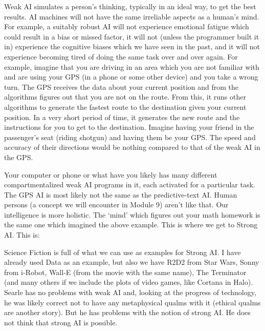 Weak AI simulates a person's thinking, typically in an ideal way, to get the best results. AI machines will not have the same irreliable aspects as a human's mind. For example, a suitably robust AI will not experience emotional fatigue which could result in a bias or missed factor, it will not (unless the programmer built it in) experience the cognitive biases which we have seen in the past, and it will not experience becoming tired of doing the same task over and over again. For example, imagine that you are driving in an area which you are not familiar with and are using your GPS (in a phone or some other device) and you take a wrong turn. The GPS receives the data about your current position and from the algorithms figures out that you are not on the route. From this, it runs other algorithms to generate the fastest route to the destination given your current position. In a very short period of time, it generates the new route and the instructions for you to get to the destination. Imagine having your friend in the passenger's seat (riding shotgun) and having them be your GPS. The speed and accuracy of their directions would be nothing compared to that of the weak AI in the GPS.

Your computer or phone or what have you likely has many different compartmentalized weak AI programs in it, each activated for a particular task. The GPS AI is most likely not the same as the predictive-text AI. Human persons (a concept we will encounter in Module 9) aren't like that. Our intelligence is more holistic. The `mind' which figures out your math homework is the same one which imagined the above example. This is where we get to Strong AI. This is:


Science Fiction is full of what we can use as examples for Strong AI. I have already used Data as an example, but also we have R2D2 from Star Wars, Sonny from i-Robot, Wall-E (from the movie with the same name),  The Terminator (and many others if we include the plots of video games, like Cortana in Halo).  Searle has no problems with weak AI and, looking at the progress of technology, he was likely correct not to have any metaphysical qualms with it (ethical qualms are another story).  But he has problems with the notion of strong AI. He does not think that strong AI is possible.

